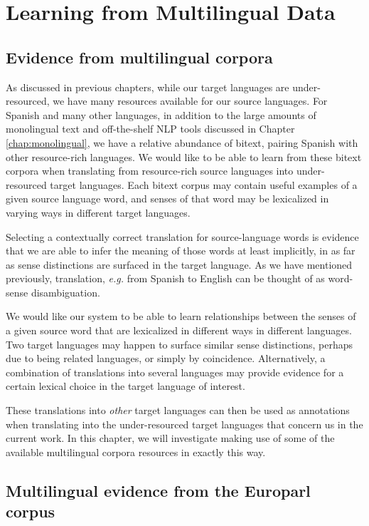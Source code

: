 \chapter{Learning from Multilingual Data}
\label{chap:multilingual}

\section{Evidence from multilingual corpora}
As discussed in previous chapters, while our target languages are
under-resourced, we have many resources available for our source languages.
For Spanish and many other languages, in addition to the large amounts of
monolingual text and off-the-shelf NLP tools discussed in Chapter
\ref{chap:monolingual}, we have a relative abundance of bitext, pairing Spanish
with other resource-rich languages.
We would like to be able to learn from these bitext corpora when translating
from resource-rich source languages into under-resourced target languages.
Each bitext corpus may contain useful examples of a given source language word,
and senses of that word may be lexicalized in varying ways in different target
languages.

Selecting a contextually correct translation for source-language words is
evidence that we are able to infer the meaning of those words at least
implicitly, in as far as sense distinctions are surfaced in the target
language.
As we have mentioned previously, translation,
\emph{e.g.} from Spanish to English can be thought of as word-sense
disambiguation.

We would like our system to be able to learn relationships between the
senses of a given source word that are lexicalized in different ways in
different languages.
Two target languages may happen to surface similar sense distinctions, perhaps
due to being related languages, or simply by coincidence. Alternatively, a
combination of translations into several languages may provide evidence for a
certain lexical choice in the target language of interest.

These translations into \emph{other} target languages can then be used as
annotations when translating into the under-resourced target languages that
concern us in the current work. In this chapter, we will investigate making use
of some of the available multilingual corpora resources in exactly this way.

\section{Multilingual evidence from the Europarl corpus}

